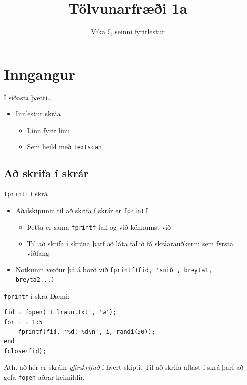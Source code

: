 \documentclass[handout]{beamer}
\title{Tölvunarfræði 1a}
\subtitle{Vika 9, seinni fyrirlestur}
\begin{document}
\begin{frame}
\titlepage
\end{frame}

\section{Inngangur}

\begin{frame}{Í síðasta þætti\ldots}
    \begin{itemize}
    \item Innlestur skráa
    \begin{itemize}
        \item Línu fyrir línu
        \item Sem heild með \texttt{textscan}
    \end{itemize}
    \end{itemize}
\end{frame}

\subsection{Að skrifa í skrár}

\begin{frame}[fragile]{\texttt{fprintf} í skrá}
\begin{itemize}
 \item Aðalskipunin til að skrifa í skrár er \texttt{fprintf}
 \begin{itemize}
  \item Þetta er sama \texttt{fprintf} fall og við könnumst við
  \item Til að skrifa í skrána þarf að láta fallið fá skráarauðkenni sem fyrsta viðfang
 \end{itemize}
 \item Notkunin verður þá á borð við \verb|fprintf(fid, 'snið', breyta1, breyta2...)|
\end{itemize}
\end{frame}

\begin{frame}[fragile]{\texttt{fprintf} í skrá}
Dæmi:
\begin{verbatim}
fid = fopen('tilraun.txt', 'w');
for i = 1:5
    fprintf(fid, '%d: %d\n', i, randi(50));
end
fclose(fid);
\end{verbatim}
Ath. að hér er skráin \emph{yfirskrifuð} í hvert skipti. Til að skrifa aftast í skrá þarf að gefa \texttt{fopen} aðrar heimildir.
\end{frame}
\end{document}
